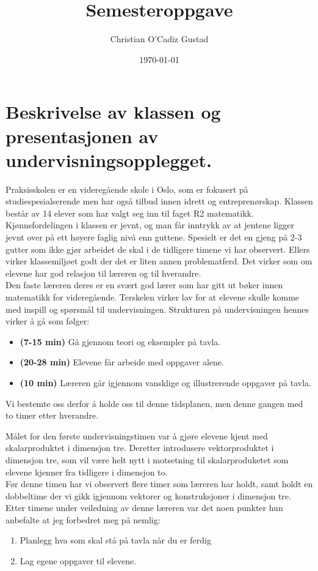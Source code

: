 \documentclass[11pt]{article}
\author{Christian O'Cadiz Gustad}
\date{\today}
\title{Semesteroppgave}
\begin{document}
\maketitle



\section{Beskrivelse av klassen og presentasjonen av undervisningsopplegget.}
\label{sec-1}

Praksisskolen er en videregående skole i Oslo, som er fokusert på studiespesialserende men har også tilbud innen idrett og entreprenørskap. Klassen består av 14 elever som har valgt seg inn til faget R2 matematikk. Kjønnsfordelingen i klassen er jevnt, og man får inntrykk av at jentene ligger jevnt over på ett høyere faglig nivå enn guttene. Spesielt er det en gjeng på 2-3 gutter som ikke gjør arbeidet de skal i de tidligere timene vi har observert. Ellers virker klassemiljøet godt der det er liten annen problematferd. Det virker som om elevene har god relasjon til læreren og til hverandre.\\

Den faste læreren deres er en svært god lærer som har gitt ut bøker innen matematikk for videregående. Terskelen virker lav for at elevene skulle  komme med inspill og spørsmål til undervisningen. 
Strukturen på undervisningen hennes virker å gå som følger:
\begin{itemize}
\item \textbf{(7-15 min)} Gå gjennom teori og eksempler på tavla.
\item \textbf{(20-28 min)} Elevene får arbeide med oppgaver alene.
\item \textbf{(10 min)} Læreren går igjennom vansklige og illustrerende oppgaver på tavla.
\end{itemize}
Vi bestemte oss derfor å holde oss til denne tidsplanen, men denne gangen med to timer etter hverandre.

Målet for den første undervisningstimen var å gjøre elevene kjent med skalarproduktet i dimensjon tre. Deretter introdusere vektorproduktet i dimensjon tre, som vil være helt nytt i motsetning til skalarproduketet som elevene kjenner fra tidligere i dimensjon to.\\

Før denne timen har vi observert flere timer som læreren har holdt, samt holdt en dobbeltime der vi gikk igjennom vektorer og konstruksjoner i dimensjon tre.\\
Etter  timene under veiledning av denne læreren var det noen punkter hun anbefalte at jeg forbedret meg på nemlig:
\begin{enumerate}
\item Planlegg hva som skal stå på tavla når du er ferdig
\item Lag egene oppgaver til elevene.
\end{enumerate}







\end{document}
